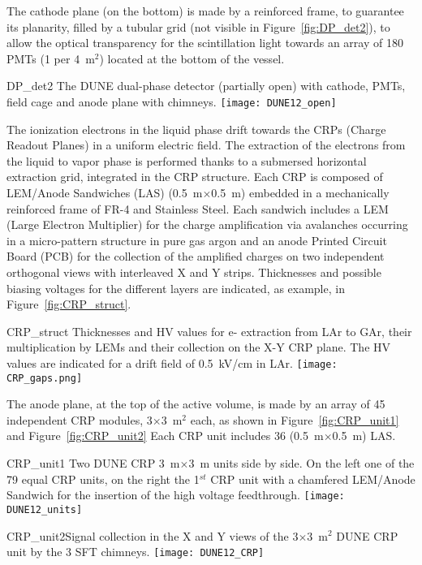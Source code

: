 The cathode plane (on the bottom) is made by a reinforced frame, to
guarantee its planarity, filled by a tubular grid (not visible in
Figure~\ref{fig:DP_det2}), to allow the optical transparency for the
scintillation light towards an array of 180 PMTs (1 per 4~m$^2$)
located at the bottom of the vessel.
\begin{cdrfigure}{DP_det2}
{The DUNE dual-phase detector (partially open) with cathode, PMTs, field cage and anode plane with chimneys.}
\texttt{[image: DUNE12\_open]}
\end{cdrfigure}

The ionization electrons in the liquid phase drift towards the CRPs
(Charge Readout Planes) in a uniform electric field. The extraction of
the electrons from the liquid to vapor phase is performed thanks to a
submersed horizontal extraction grid, integrated in the CRP structure.
Each CRP is composed of LEM/Anode Sandwiches (LAS) (0.5~m$\times$0.5~m)
embedded in a mechanically reinforced frame of FR-4 and Stainless
Steel.  Each sandwich includes a LEM (Large Electron Multiplier) for
the charge amplification via avalanches occurring in a micro-pattern
structure in pure gas argon and an anode Printed Circuit Board (PCB)
for the collection of the amplified charges on two independent
orthogonal views with interleaved X and Y strips.  Thicknesses and
possible biasing voltages for the different layers are indicated, as
example, in Figure~\ref{fig:CRP_struct}.

\begin{cdrfigure}{CRP_struct}
{Thicknesses and HV values for e- extraction from LAr to GAr, their 
multiplication by LEMs and their collection on the X-Y CRP plane. The 
HV values are indicated for a drift field of 0.5~kV/cm in LAr.}
\texttt{[image: CRP\_gaps.png]}
\end{cdrfigure}

The anode plane, at the top of the active volume, is made by an array
of 45 independent CRP modules, 3$\times$3~m$^2$ each, as shown in
Figure~\ref{fig:CRP_unit1} and Figure~\ref{fig:CRP_unit2} Each CRP
unit includes 36 (0.5~m$\times$0.5~m) LAS.
\begin{cdrfigure}{CRP_unit1}
{Two DUNE CRP 3~m$\times$3~m units side by side. On the left one of the 79 equal 
CRP units, on the right the 1$^{st}$ CRP unit with a chamfered LEM/Anode Sandwich 
for the insertion of the high voltage feedthrough.}
\texttt{[image: DUNE12\_units]}
\end{cdrfigure}
\begin{cdrfigure}
{CRP_unit2}{Signal collection in the X and Y views of the  3$\times$3~m$^2$ DUNE CRP unit by the 3 SFT chimneys.}
\texttt{[image: DUNE12\_CRP]}
\end{cdrfigure}

